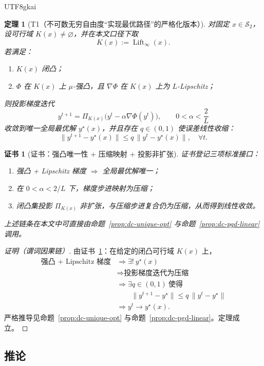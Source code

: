\documentclass[12pt]{article}
\newtheorem{theorem}{定理}[section]
\newtheorem{Certificate}{证书}[section]
\newcommand{\Lift}{\operatorname{Lift}}
\begin{document}
\begin{CJK*}{UTF8}{gkai}
\begin{theorem}[T1（不可数无穷自由度“实现最优路径”的严格化版本）]\label{thm:T1-uncountable-optimal-path}
对固定 $x\in\mathcal S_2$，设可行域 $K(x)\neq\varnothing$，并在本文口径下取
\[
K(x):=\Lift_\infty(x).
\]
若满足：
\begin{enumerate}
\item $K(x)$ 闭凸；
\item $\Phi$ 在 $K(x)$ 上 $\mu$-强凸，且 $\nabla\Phi$ 在 $K(x)$ 上为 $L$-Lipschitz；
\end{enumerate}
则投影梯度迭代
\[
y^{t+1}=\Pi_{K(x)}\bigl(y^t-\alpha\nabla\Phi(y^t)\bigr),\qquad 0<\alpha<\frac{2}{L}
\]
收敛到唯一全局最优解 $y^\star(x)$，并且存在 $q\in(0,1)$ 使误差线性收缩：
\[
\|y^{t+1}-y^\star(x)\|\le q\,\|y^t-y^\star(x)\|,\quad \forall t.
\]
\end{theorem}

\begin{Certificate}[证书：强凸唯一性 + 压缩映射 + 投影非扩张]\label{cert:T1-uncountable-optimal-path}
证书登记三项标准接口：
\begin{enumerate}
\item 强凸 + Lipschitz 梯度 $\Rightarrow$ 全局最优解唯一；
\item 在 $0<\alpha<2/L$ 下，梯度步进映射为压缩；
\item 闭凸集投影 $\Pi_{K(x)}$ 非扩张，与压缩步进复合仍为压缩，从而得到线性收敛。
\end{enumerate}
上述链条在本文中可直接由命题~\ref{prop:dc-unique-opt} 与命题~\ref{prop:dc-pgd-linear} 调用。
\end{Certificate}

\begin{proof}[证明（谓词因果链）]
由证书~\ref{cert:T1-uncountable-optimal-path}：在给定的闭凸可行域 $K(x)$ 上，
\[
\begin{aligned}
\text{强凸 + Lipschitz 梯度}
&\Rightarrow
\exists!\ y^\star(x)\\
&\Rightarrow
\text{投影梯度迭代为压缩}\\
&\Rightarrow
\exists q\in(0,1)\ \text{使得}\\
&\qquad
\|y^{t+1}-y^\star\|\le q\,\|y^t-y^\star\|\\
&\Rightarrow
y^t\to y^\star(x).
\end{aligned}
\]
严格推导见命题~\ref{prop:dc-unique-opt} 与命题~\ref{prop:dc-pgd-linear}。定理成立。
\end{proof}

\subsection{推论}


\end{CJK*}
\end{document}

